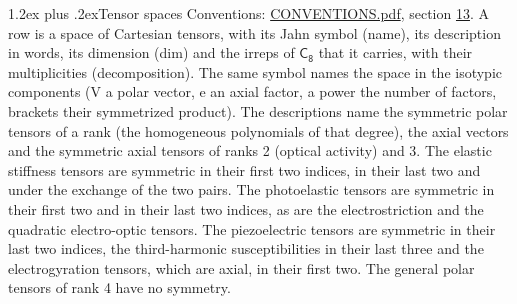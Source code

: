 \documentclass[10pt,a4paper]{article}
\makeatletter
\renewcommand\section{\@startsection{section}{1}{\z@}{-3ex plus -1ex minus -.2ex}%
  {1.2ex plus .2ex}{\normalfont\large\sffamily\bfseries\color{parttitle}}}
\numberwithin{equation}{section}
\newcommand{\grp}[1]{\mathsf{#1}}
\makeatother
\begin{document}
\section{Tensor spaces}\label{s:tensor_spaces}
Conventions: \href{../../CONVENTIONS.pdf}{CONVENTIONS.pdf}, section \href{../../CONVENTIONS.pdf\#conv.13}{13}.
\leavevmode\label{n:head.name}\label{n:head.description}\label{n:head.dim}\label{n:head.decomposition}A row is a space of Cartesian tensors, with its Jahn symbol (name), its description in words, its dimension (dim) and the irreps of $\grp{C_{8}}$ that it carries, with their multiplicities (decomposition). \label{n:label.jahn}The same symbol names the space in the isotypic components (V a polar vector, e an axial factor, a power the number of factors, brackets their symmetrized product). The descriptions name the symmetric polar tensors of a rank (the homogeneous polynomials of that degree), the axial vectors and the symmetric axial tensors of ranks 2 (optical activity) and 3. The elastic stiffness tensors are symmetric in their first two indices, in their last two and under the exchange of the two pairs. The photoelastic tensors are symmetric in their first two and in their last two indices, as are the electrostriction and the quadratic electro-optic tensors. The piezoelectric tensors are symmetric in their last two indices, the third-harmonic susceptibilities in their last three and the electrogyration tensors, which are axial, in their first two. The general polar tensors of rank 4 have no symmetry.
\end{document}
